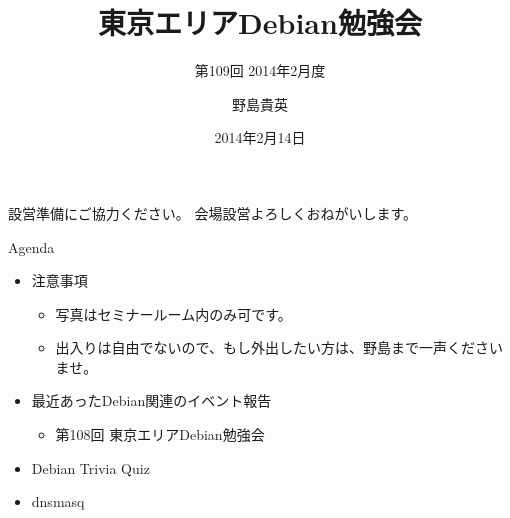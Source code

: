\title{東京エリアDebian勉強会}
\subtitle{第109回 2014年2月度}
\author{野島貴英}
\date{2014年2月14日}



\begin{frame}
\titlepage{}
\end{frame}

\begin{frame}{設営準備にご協力ください。}
会場設営よろしくおねがいします。
\end{frame}

\begin{frame}{Agenda}
 \begin{minipage}[t]{0.45\hsize}
  \begin{itemize}
   \item 注意事項
	 \begin{itemize}
	  \item 写真はセミナールーム内のみ可です。
          \item 出入りは自由でないので、もし外出したい方は、野島まで一声くださいませ。
	 \end{itemize}
   \item 最近あったDebian関連のイベント報告
	 \begin{itemize}
	  \item 第108回 東京エリアDebian勉強会
	 \end{itemize}
  \end{itemize}
 \end{minipage} 
 \begin{minipage}[t]{0.45\hsize}
  \begin{itemize}
   \item Debian Trivia Quiz
   \item dnsmasq
  \end{itemize}
 \end{minipage}
\end{frame}

